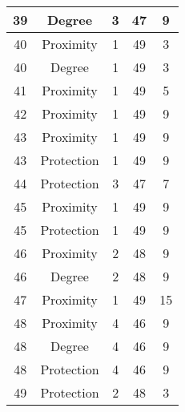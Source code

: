 \documentclass[results.tex]{subfiles}
\begin{document}
\begin{center}
\begin{tabular}{| c || c | c | c | c |}
    \hline
    39 & Degree & 3 & 47 & 9 \\ 
    \hline
    40 & Proximity & 1 & 49 & 3 \\ 
    \hline
    40 & Degree & 1 & 49 & 3 \\ 
    \hline
    41 & Proximity & 1 & 49 & 5 \\ 
    \hline
    42 & Proximity & 1 & 49 & 9 \\ 
    \hline
    43 & Proximity & 1 & 49 & 9 \\ 
    \hline
    43 & Protection & 1 & 49 & 9 \\ 
    \hline
    44 & Protection & 3 & 47 & 7 \\ 
    \hline
    45 & Proximity & 1 & 49 & 9 \\ 
    \hline
    45 & Protection & 1 & 49 & 9 \\ 
    \hline
    46 & Proximity & 2 & 48 & 9 \\ 
    \hline
    46 & Degree & 2 & 48 & 9 \\ 
    \hline
    47 & Proximity & 1 & 49 & 15 \\ 
    \hline
    48 & Proximity & 4 & 46 & 9 \\ 
    \hline
    48 & Degree & 4 & 46 & 9 \\ 
    \hline
    48 & Protection & 4 & 46 & 9 \\ 
    \hline
    49 & Protection & 2 & 48 & 3 \\ 
    \hline   \end{tabular}
\end{center}
\end{document}
